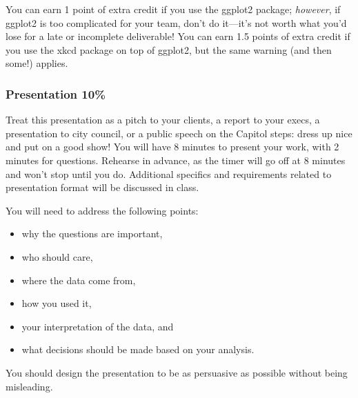 \documentclass[11pt]{article}
\begin{document}
You can earn 1 point of extra credit if you use the ggplot2 package; \textit{however}, if ggplot2 is too complicated for your team, don't do it---it's not worth what you'd lose for a late or incomplete deliverable!
You can earn 1.5 points of extra credit if you use the xkcd package on top of ggplot2, but the same warning (and then some!) applies.

\subsubsection{Presentation 10\%}

Treat this presentation as a pitch to your clients, a report to your execs, a presentation to city council, or a public speech on the Capitol steps: dress up nice and put on a good show!
You will have 8 minutes to present your work, with 2 minutes for questions.
Rehearse in advance, as the timer will go off at 8 minutes and won't stop until you do.
Additional specifics and requirements related to presentation format will be discussed in class.


You will need to address the following points: 
\begin{itemize}
\item why the questions are important, 
\item who should care, 
\item where the data come from, 
\item how you used it, 
\item your interpretation of the data, and 
\item what decisions should be made based on your analysis.
\end{itemize}
You should design the presentation to be as persuasive as possible without being misleading.
\end{document}
